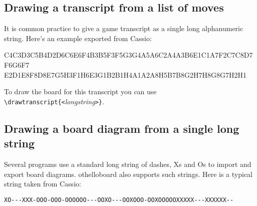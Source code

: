 \documentclass[a4paper,12pt]{article}
\begin{document}
\subsection{Drawing a transcript from a list of moves}

It is common practice to give a game transcript as a single long alphanumeric string. Here's an example exported from Cassio:

C4C3D3C5B4D2D6C6E6F4B3B5F3F5G3G4A5A6C2A4A3B6E1C1A7F2C7C8D7F6G6F7
E2D1E8F8D8E7G5H3F1H6E3G1B2B1H4A1A2A8H5B7B8G2H7H8G8G7H2H1

To draw the board for this transcript you can use \verb=\drawtranscript{<=\emph{longstring}\verb=>}=.

\begin{center}%
\begin{minipage}[c]{160pt}%
\vspace{0pt}
\begin{othelloboard}{.8}
\end{othelloboard}
\end{minipage}
\hfill
\begin{minipage}[c]{264pt}
\begin{footnotesize}
\begin{verbatimtab}
\begin{othelloboard}{.8}
\end{othelloboard}
\end{verbatimtab}
\end{footnotesize}
\end{minipage}
\end{center}

\subsection{Drawing a board diagram from a single long string}
Several programs use a standard long string of dashes, Xs and Os to import and export board diagrams. \textsf{othelloboard} also supports such strings. Here is a typical string taken from Cassio:

\begin{small}
\verb=XO---XXX-OOO-OOO-OOOOOO---OOXO---OOXOOO-OOXOOOOOXXXXX---XXXXXX--=
\end{small}
\end{document}
